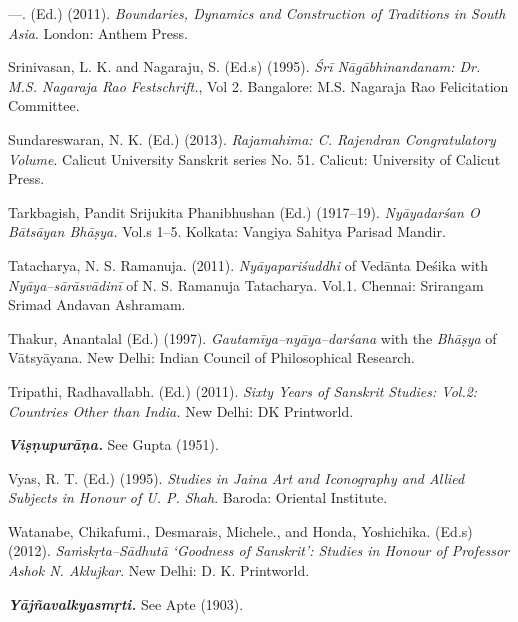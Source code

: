  \item —. (Ed.) (2011). \textit{Boundaries, Dynamics and Construction of Traditions in South Asia}. London: Anthem Press.

 \item Srinivasan, L. K. and Nagaraju, S. (Ed.s) (1995). \textit{Śrī Nāgābhinandanam: Dr. M.S. Nagaraja Rao Festschrift.}, Vol 2. Bangalore: M.S. Nagaraja Rao Felicitation Committee.

 \item Sundareswaran, N. K. (Ed.) (2013).\textit{ Rajamahima: C. Rajendran Congratulatory Volume}. Calicut University Sanskrit series No. 51. Calicut: University of Calicut Press.

 \item Tarkbagish, Pandit Srijukita Phanibhushan (Ed.) (1917–19). \textit{Nyāyadarśan O Bātsāyan Bhāṣya.} Vol.s 1–5. Kolkata: Vangiya Sahitya Parisad Mandir.

 \item Tatacharya, N. S. Ramanuja. (2011). \textit{Nyāyapariśuddhi} of Vedānta Deśika with \textit{Nyāya–sārāsvādinī} of N. S. Ramanuja Tatacharya. Vol.1. Chennai: Srirangam Srimad Andavan Ashramam.

 \item Thakur, Anantalal (Ed.) (1997). \textit{Gautamīya–nyāya–darśana} with the \textit{Bhāṣya} of Vātsyāyana. New Delhi: Indian Council of Philosophical Research.

 \item Tripathi, Radhavallabh. (Ed.) (2011). \textit{Sixty Years of Sanskrit Studies: Vol.2: Countries Other than India. }New Delhi: DK Printworld.

 \item \textit{\textbf{Viṣṇupurāṇa.}} See Gupta (1951).

 \item Vyas, R. T. (Ed.) (1995). \textit{Studies in Jaina Art and Iconography and Allied Subjects in Honour of U. P. Shah}. Baroda: Oriental Institute.

 \item Watanabe, Chikafumi., Desmarais, Michele., and Honda, Yoshichika. (Ed.s) (2012). \textit{Saṁskṛta–Sādhutā ‘Goodness of Sanskrit’: Studies in Honour of Professor Ashok N. Aklujkar}. New Delhi: D. K. Printworld.

 \item \textit{\textbf{Yājñavalkyasmṛti.}} See Apte (1903).

